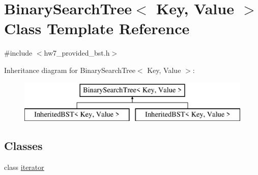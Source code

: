 \hypertarget{classBinarySearchTree}{}\section{Binary\+Search\+Tree$<$ Key, Value $>$ Class Template Reference}
\label{classBinarySearchTree}


{\ttfamily \#include $<$hw7\+\_\+provided\+\_\+bst.\+h$>$}

Inheritance diagram for Binary\+Search\+Tree$<$ Key, Value $>$\+:\begin{figure}[H]
\begin{center}
\leavevmode
\includegraphics[height=2.000000cm]{classBinarySearchTree}
\end{center}
\end{figure}
\subsection*{Classes}
\begin{DoxyCompactItemize}
\item 
class \mbox{\hyperlink{classBinarySearchTree_1_1iterator}{iterator}}
\end{DoxyCompactItemize}
